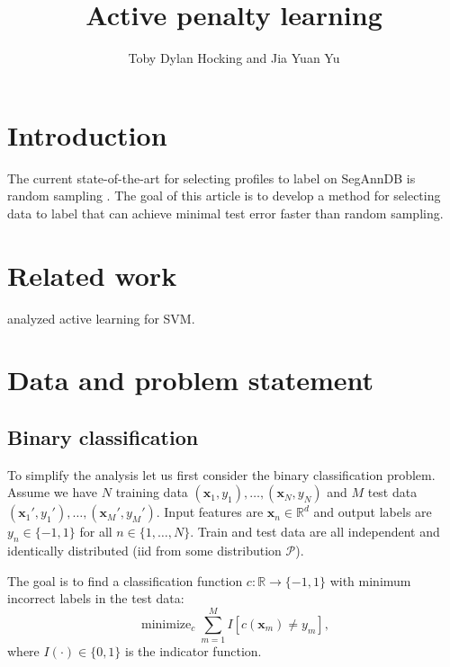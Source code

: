 \documentclass{article}
\newcommand{\RR}{\mathbb R}
\DeclareMathOperator*{\minimize}{minimize}
\begin{document}
\title{Active penalty learning}

\author{Toby Dylan Hocking and Jia Yuan Yu}

\maketitle

\section{Introduction}

The current state-of-the-art for selecting profiles to label on
SegAnnDB is random sampling \citep{HOCKING-SegAnnDB}. The goal of this article
is to develop a method for selecting data to label that can achieve
minimal test error faster than random sampling.

\section{Related work}

\citet{SVMactive} analyzed active learning for SVM.

\section{Data and problem statement}

\subsection{Binary classification}

To simplify the analysis let us first consider the binary
classification problem. Assume we have $N$ training data $(\mathbf
x_1, y_1), \dots, (\mathbf x_N, y_N)$ and $M$ test data $(\mathbf
x_1', y_1'), \dots, (\mathbf x_M', y_M')$. Input features are $\mathbf
x_n\in\RR^d$ and output labels are $y_n\in\{-1, 1\}$ for all
$n\in\{1,\dots,N\}$. Train and test data are all independent and
identically distributed (iid from some distribution $\mathcal P$).

The goal is to find a classification function $c:\RR\rightarrow\{-1,
1\}$ with minimum incorrect labels in the test data:
\begin{equation}
  \label{eq:min_test_error}
  \minimize_c \sum_{m=1}^M
  I\left[
    c(\mathbf x_m) \neq y_m
  \right],
\end{equation}
where $I(\cdot)\in\{0,1\}$ is the indicator function.
\end{document}
